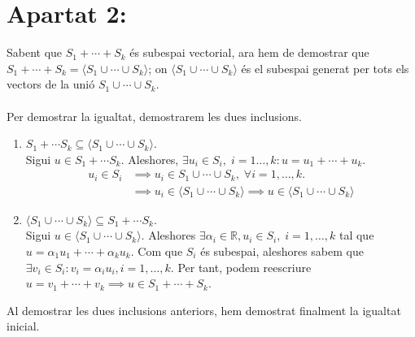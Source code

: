 \documentclass[a4paper, 12pt]{article}
\begin{document}
    \section*{Apartat 2:}
    Sabent que $S_1+\cdots+S_k$ \'es subespai vectorial, ara hem de demostrar que $S_1+\cdots+S_k = \langle S_1 \cup \cdots \cup S_k \rangle$; on $\langle S_1 \cup \cdots \cup S_k \rangle$ \'es el subespai generat per tots els vectors de la uni\'o $S_1\cup\cdots\cup S_k$.\\
    \\Per demostrar la igualtat, demostrarem les dues inclusions.\\
    \begin{enumerate}
        \item $S_1+\cdots S_k \subseteq \langle S_1 \cup \cdots \cup S_k \rangle$.\\
              Sigui $u \in S_1+\cdots S_k$. Aleshores, $\exists u_i \in S_i, \; i = 1\dots,k : u = u_1+\cdots+u_k$.
              \begin{align*}
                  u_i \in S_i &\implies u_i \in S_1 \cup\cdots\cup S_k,\; \forall i=1,\dots,k.\\
                              &\implies u_i \in \langle S_1 \cup \cdots \cup S_k \rangle \implies u \in \langle S_1 \cup \cdots \cup S_k \rangle
              \end{align*}
        \item $\langle S_1 \cup \cdots \cup S_k \rangle \subseteq S_1+\cdots S_k $.\\
              Sigui $u \in \langle S_1 \cup \cdots \cup S_k \rangle$. Aleshores $\exists \alpha_i \in \mathbb{R}, u_i \in S_i,\; i = 1,\dots,k$ tal que $u = \alpha_1u_1 + \cdots + \alpha_ku_k$. Com que $S_i$ \'es subespai, aleshores sabem que $\exists v_i \in S_i : v_i = \alpha_iu_i, i = 1,\dots,k$. Per tant, podem reescriure $u = v_1 + \cdots + v_k \implies u \in S_1 + \cdots + S_k$.
    \end{enumerate}
    Al demostrar les dues inclusions anteriors, hem demostrat finalment la igualtat inicial.
\end{document}
